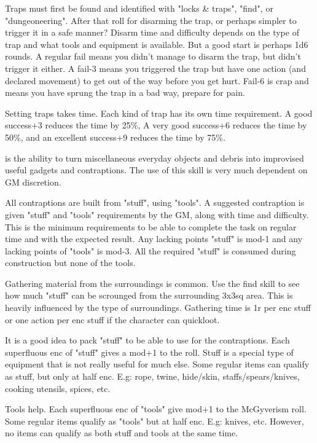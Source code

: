Traps must first be found and identified with "locks \& traps", "find", or "dungeoneering". After that roll for disarming the trap, or perhaps simpler to trigger it in a safe manner? Disarm time and difficulty depends on the type of trap and what tools and equipment is available. But a good start is perhaps 1d6 rounds.
A regular fail means you didn't manage to disarm the trap, but didn't trigger it either. A fail-3 means you triggered the trap but have one action (and declared movement) to get out of the way before you get hurt. Fail-6 is crap and means you have sprung the trap in a bad way, prepare for pain.

Setting traps takes time. Each kind of trap has its own time requirement. A good success+3 reduces the time by 25\%, A very good success+6 reduces the time by 50\%, and an excellent success+9 reduces the time by 75\%.


 is the ability to turn miscellaneous everyday objects and debris into improvised useful gadgets and contraptions. The use of this skill is very much dependent on GM discretion.

All contraptions are built from "stuff", using "tools". A suggested contraption is given "stuff" and "tools" requirements by the GM, along with time and difficulty. This is the minimum requirements to be able to complete the task on regular time and with the expected result. Any lacking points "stuff" is mod-1 and any lacking points of "tools" is mod-3.
All the required "stuff" is consumed during construction but none of the tools.

Gathering material from the surroundings is common. Use the find skill to see how much "stuff" can be scrounged from the surrounding 3x3sq area. This is heavily influenced by the type of surroundings. Gathering time is 1r per enc stuff or one action per enc stuff if the character can quickloot.

It is a good idea to pack "stuff" to be able to use for the contraptions. Each superfluous enc of "stuff" gives a mod+1 to the roll. Stuff is a special type of equipment that is not really useful for much else. Some regular items can qualify as stuff, but only at half enc. E.g: rope, twine, hide/skin, staffs/spears/knives, cooking utensils, spices, etc.

Tools help. Each superfluous enc of "tools" give mod+1 to the McGyverism roll. Some regular items qualify as "tools" but at half enc. E.g: knives, etc. However, no items can qualify as both stuff and tools at the same time.

